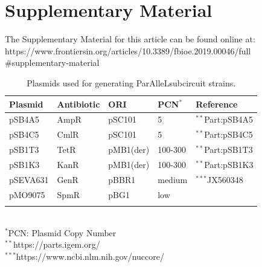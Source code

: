 \section{Supplementary Material}

The Supplementary Material for this article can be found online at: https://www.frontiersin.org/articles/10.3389/fbioe.2019.00046/full
\#supplementary-material

\begin{table}[htb]
\caption{Plasmids used for generating ParAlleLsubcircuit strains.\\}
\label{table:11}%
{%
\begin{tabular*}{\columnwidth}{@{}lllll@{}}
\hline
\textbf{Plasmid} & \textbf{Antibiotic} & \textbf{ORI} & \textbf{PCN$^*$}  & \textbf{Reference}\\
\hline
pSB4A5 & AmpR & pSC101 & 5 & $^{**}$Part:pSB4A5\\
pSB4C5 & CmlR & pSC101 & 5 & $^{**}$Part:pSB4C5\\
pSB1T3 & TetR & pMB1(der) & 100-300 & $^{**}$Part:pSB1T3\\
pSB1K3 & KanR & pMB1(der) & 100-300 & $^{**}$Part:pSB1K3\\
pSEVA631 & GenR & pBBR1 & medium & $^{***}$JX560348\\
pMO9075 & SpmR & pBG1 & low & \cite{keller2011methods}\\

\\
\hline
\hline
\end{tabular*}
}
\\
{
\footnotesize{$^*$PCN: Plasmid Copy Number}\\
\footnotesize{$^{**}$https://parts.igem.org/}\\
\footnotesize{$^{***}$https://www.ncbi.nlm.nih.gov/nuccore/}
}
\end{table}




